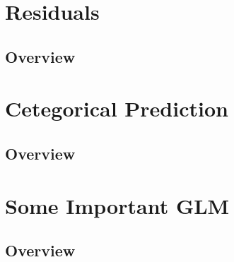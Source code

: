 \documentclass[11pt,fleqn]{book} %
\begin{document}


\chapter{Residuals}

\section{Overview}



\chapter{Cetegorical Prediction}

\section{Overview}



\chapter{Some Important GLM}

\section{Overview}

\end{document}
